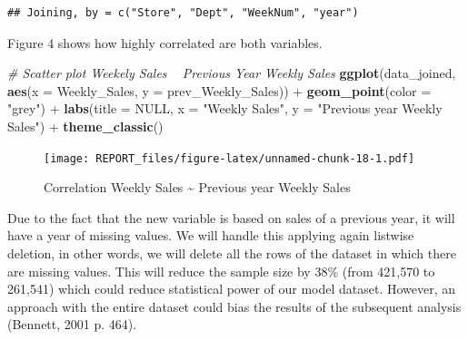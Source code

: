 \documentclass[11pt,]{article}
\newenvironment{Shaded}{\begin{snugshade}}{\end{snugshade}}
\newcommand{\KeywordTok}[1]{\textcolor[rgb]{0.13,0.29,0.53}{\textbf{{#1}}}}
\newcommand{\DataTypeTok}[1]{\textcolor[rgb]{0.13,0.29,0.53}{{#1}}}
\newcommand{\DecValTok}[1]{\textcolor[rgb]{0.00,0.00,0.81}{{#1}}}
\newcommand{\StringTok}[1]{\textcolor[rgb]{0.31,0.60,0.02}{{#1}}}
\newcommand{\CommentTok}[1]{\textcolor[rgb]{0.56,0.35,0.01}{\textit{{#1}}}}
\newcommand{\OtherTok}[1]{\textcolor[rgb]{0.56,0.35,0.01}{{#1}}}
\newcommand{\NormalTok}[1]{{#1}}
\begin{document}
\begin{Shaded}
\end{Shaded}

\begin{verbatim}
## Joining, by = c("Store", "Dept", "WeekNum", "year")
\end{verbatim}

Figure 4 shows how highly correlated are both variables.

\begin{Shaded}
\begin{Highlighting}[]
\CommentTok{# Scatter plot Weekely Sales ~ Previous Year Weekly Sales}
\KeywordTok{ggplot}\NormalTok{(data_joined, }\KeywordTok{aes}\NormalTok{(}\DataTypeTok{x =} \NormalTok{Weekly_Sales, }\DataTypeTok{y =} \NormalTok{prev_Weekly_Sales)) +}\StringTok{ }
\StringTok{    }\KeywordTok{geom_point}\NormalTok{(}\DataTypeTok{color =} \StringTok{"grey"}\NormalTok{) +}\StringTok{ }\KeywordTok{labs}\NormalTok{(}\DataTypeTok{title =} \OtherTok{NULL}\NormalTok{, }\DataTypeTok{x =} \StringTok{"Weekly Sales"}\NormalTok{, }
    \DataTypeTok{y =} \StringTok{"Previous year Weekly Sales"}\NormalTok{) +}\StringTok{ }\KeywordTok{theme_classic}\NormalTok{()}
\end{Highlighting}
\end{Shaded}

\begin{figure}[htbp]
\centering
\texttt{[image: REPORT\_files/figure-latex/unnamed-chunk-18-1.pdf]}
\caption{Correlation Weekly Sales \textasciitilde{} Previous year Weekly
Sales}
\end{figure}

Due to the fact that the new variable is based on sales of a previous
year, it will have a year of missing values. We will handle this
applying again listwise deletion, in other words, we will delete all the
rows of the dataset in which there are missing values. This will reduce
the sample size by 38\% (from 421,570 to 261,541) which could reduce
statistical power of our model dataset. However, an approach with the
entire dataset could bias the results of the subsequent analysis
(Bennett, 2001 p. 464).
\end{document}
